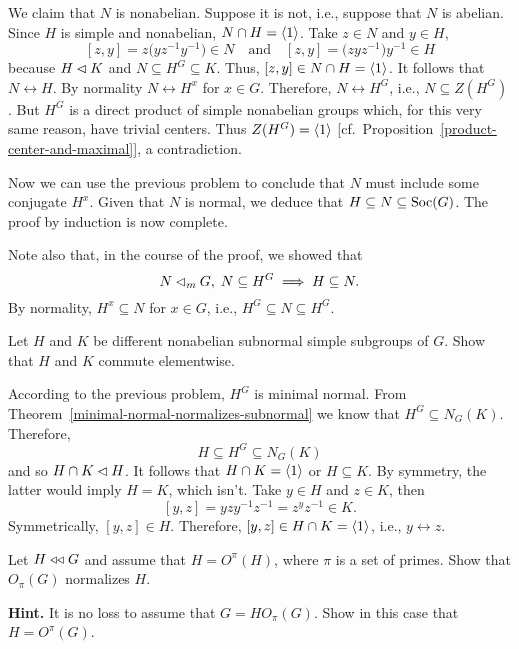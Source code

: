 \begin{solution}
We claim that $N$ is nonabelian. Suppose it is not, i.e., suppose that $N$ is abelian. Since $H$ is simple and nonabelian, $N\cap H=\langle1\rangle$. Take $z\in N$ and $y\in H$,
$$
    [z,y]=z\big(yz^{-1}y^{-1}\big)\in N\quad\textrm{and}\quad
        [z,y]=\big(zyz^{-1}\big)y^{-1}\in H
$$
because $H\lhd K$ and $N\subseteq H^G\subseteq K$. Thus, $[z,y]\in N\cap H=\langle1\rangle$. It follows that $N\leftrightarrow H$. By normality $N\leftrightarrow H^x$ for $x\in G$. Therefore, $N\leftrightarrow H^G$, i.e., $N\subseteq Z(H^G)$. But $H^G$ is a direct product of simple nonabelian groups which, for this very same reason, have trivial centers. Thus $Z(H^G)=\langle1\rangle$ [cf.~Proposition~\ref{product-center-and-maximal}], a contradiction.

Now we can use the previous problem to conclude that $N$ must include some conjugate $H^x$. Given that $N$ is normal, we deduce that $H\subseteq N\subseteq{\rm Soc}(G)$. The proof by induction is now complete.

\medskip

Note also that, in the course of the proof, we showed that
$$
    N\lhd_mG,\; N\subseteq H^G\implies H\subseteq N.
$$
By normality, $H^x\subseteq N$ for $x\in G$, i.e., $H^G\subseteq N\subseteq H^G$.  \end{solution}

\begin{probl}
    Let\/ $H$ and\/ $K$ be different nonabelian subnormal simple subgroups of\/ $G$. Show that\/ $H$ and\/ $K$ commute elementwise.
\end{probl}

\begin{solution} According to the previous problem, $H^G$ is minimal normal. From Theorem~\ref{minimal-normal-normalizes-subnormal} we know that $H^G\subseteq N_G(K)$. Therefore,
$$
    H\subseteq H^G\subseteq N_G(K)
$$
and so $H\cap K\lhd H$. It follows that $H\cap K=\langle1\rangle$ or $H\subseteq K$. By symmetry, the latter would imply $H=K$, which isn't. Take $y\in H$ and $z\in K$, then
$$
    [y,z]=yzy^{-1}z^{-1}=z^yz^{-1}\in K.
$$
Symmetrically, $[y,z]\in H$. Therefore, $[y,z]\in H\cap K=\langle1\rangle$, i.e., $y\leftrightarrow z$.  \end{solution}


\begin{probl}
    Let\/ $H\mathrel{\triangleleft\triangleleft} G$ and assume that\/ $H = O^\pi(H)$, where\/ $\pi$ is a set of primes. Show that\/ $O_\pi(G)$ normalizes\/ $H$.

    \textrm{\rm\textbf{Hint.} It is no loss to assume that $G = HO_\pi(G)$. Show in this case that $H = O^\pi(G)$.}
\end{probl}

